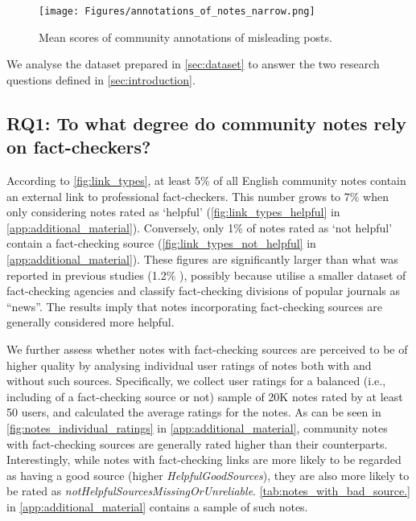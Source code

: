 




\begin{figure}
    \centering
    \texttt{[image: Figures/annotations\_of\_notes\_narrow.png]}
    \caption{Mean scores of community annotations of misleading posts.}
    \label{fig:annotations}
\end{figure}

We analyse the dataset prepared in \cref{sec:dataset} to answer the two research questions defined in \cref{sec:introduction}.

\subsection{RQ1: To what degree do community notes rely on fact-checkers?}
\label{sec:analysis_rq1}

According to \cref{fig:link_types}, at least 5\% of all English community notes contain an external link to professional fact-checkers. This number grows to 7\% when only considering notes rated as `helpful' (\cref{fig:link_types_helpful} in \cref{app:additional_material}). Conversely, only 1\% of notes rated as `not helpful' contain a fact-checking source (\cref{fig:link_types_not_helpful} in \cref{app:additional_material}). These figures are significantly larger than what was reported in previous studies (1.2\% \citep{kangur_who_2024}), possibly because \citet{kangur_who_2024} utilise a smaller dataset of fact-checking agencies and classify fact-checking divisions of popular journals as ``news''. The results imply that notes incorporating fact-checking sources are generally considered more helpful. 

We further assess whether notes with fact-checking sources are perceived to be of higher quality by analysing individual user ratings of notes both with and without such sources. Specifically, we collect user ratings for a balanced
(i.e., including of a fact-checking source or not) sample of 20K notes rated by at least 50 users, 
and calculated the average ratings for the notes. As can be seen in \cref{fig:notes_individual_ratings} in \cref{app:additional_material}, community notes with fact-checking sources are generally rated higher than their counterparts. Interestingly, while notes with fact-checking links are more likely to be regarded as having a good source (higher \textit{HelpfulGoodSources}), they are also more likely to be rated as \textit{notHelpfulSourcesMissingOrUnreliable}.  \cref{tab:notes_with_bad_source.} in \cref{app:additional_material} contains a sample of such notes. 


